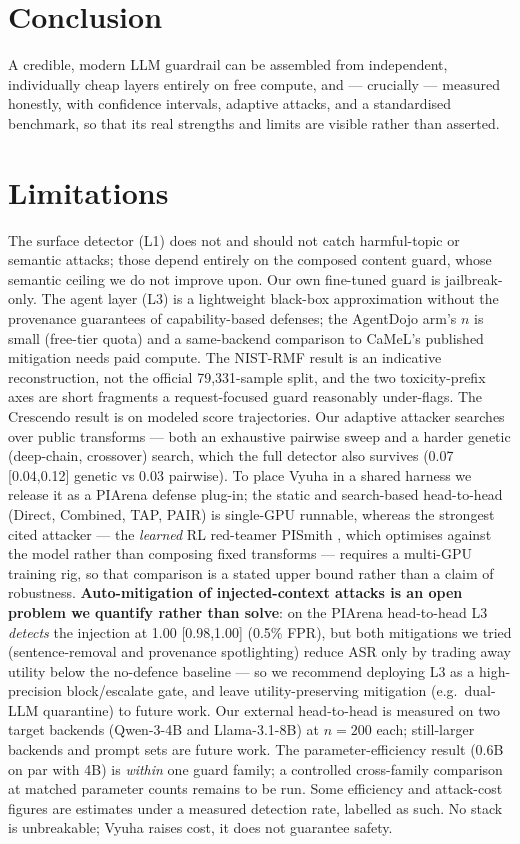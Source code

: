 \documentclass[11pt]{article}
\begin{document}
\section{Conclusion}
A credible, modern LLM guardrail can be assembled from independent, individually cheap layers entirely
on free compute, and --- crucially --- measured honestly, with confidence intervals, adaptive attacks,
and a standardised benchmark, so that its real strengths and limits are visible rather than asserted.

\section*{Limitations}
The surface detector (L1) does not and should not catch harmful-topic or semantic attacks; those
depend entirely on the composed content guard, whose semantic ceiling we do not improve upon. Our own
fine-tuned guard is jailbreak-only. The agent layer (L3) is a lightweight black-box approximation
without the provenance guarantees of capability-based defenses; the AgentDojo arm's $n$ is small
(free-tier quota) and a same-backend comparison to CaMeL's published mitigation needs paid compute.
The NIST-RMF result is an indicative reconstruction, not the official 79{,}331-sample split, and the
two toxicity-prefix axes are short fragments a request-focused guard reasonably under-flags. The
Crescendo result is on modeled score trajectories. Our adaptive attacker searches over
public transforms --- both an exhaustive pairwise sweep and a harder genetic (deep-chain, crossover)
search, which the full detector also survives (0.07 [0.04,0.12] genetic vs 0.03 pairwise). To place Vyuha in
a shared harness we release it as a PIArena \citep{piarena} defense plug-in; the static and
search-based head-to-head (Direct, Combined, TAP, PAIR) is single-GPU runnable, whereas the strongest
cited attacker --- the \emph{learned} RL red-teamer PISmith \citep{pismith}, which optimises against
the model rather than composing fixed transforms --- requires a multi-GPU training rig, so that
comparison is a stated upper bound rather than a claim of robustness. \textbf{Auto-mitigation of
injected-context attacks is an open problem we quantify rather than solve}: on the PIArena head-to-head
L3 \emph{detects} the injection at 1.00 [0.98,1.00] (0.5\% FPR), but both mitigations we tried
(sentence-removal and provenance spotlighting) reduce ASR only by trading away utility below the
no-defence baseline --- so we recommend deploying L3 as a high-precision block/escalate gate, and leave
utility-preserving mitigation (e.g.\ dual-LLM quarantine) to future work. Our external head-to-head is
measured on two target backends (Qwen-3-4B and Llama-3.1-8B) at $n{=}200$ each; still-larger backends
and prompt sets are future work. The parameter-efficiency result (0.6B on par with 4B) is \emph{within} one
guard family; a controlled cross-family comparison at matched parameter counts remains to be run. Some
efficiency and attack-cost figures are estimates under a measured detection rate, labelled as such. No
stack is unbreakable; Vyuha raises cost, it does not guarantee safety.
\end{document}
